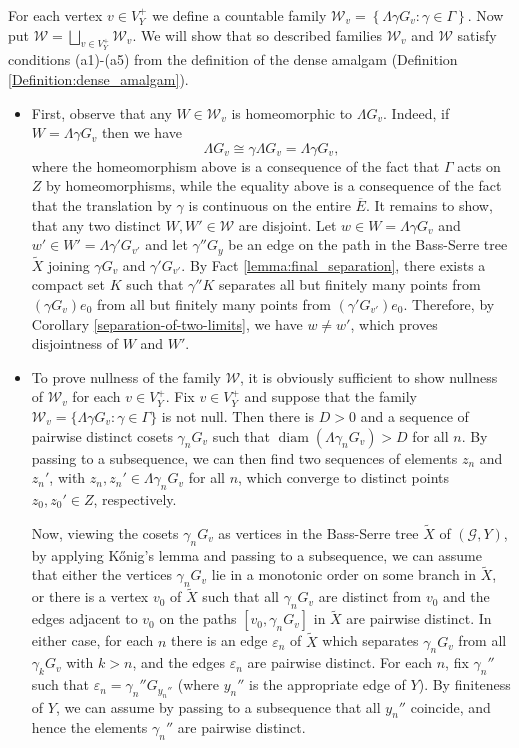 \documentclass[12pt, a4paper]{article}
\newcommand{\8}{\infty}
\newcommand{\set}[1]{\left\{ #1 \right\}}
\DeclareMathOperator{\diam}{diam}
\theoremstyle{break}
\theoremstyle{defbreak}
\newcommand{\ol}[1]{\overline{#1}}
\newcommand{\wtl}[1]{\widetilde{#1}}
\begin{document}
    For each vertex $v\in V_Y^+$ we define a countable family $\mathcal{W}_v = \set{\Lambda\gamma G_v: \gamma\in \Gamma}$. Now put $\mathcal{W} = \bigsqcup_{v\in V_Y^+}\mathcal{W}_v$. We will show that so described families $\mathcal{W}_v$ and $\mathcal{W}$ satisfy conditions (a1)-(a5) from the definition of the dense amalgam (Definition \ref{Definition:dense_amalgam}).
    \begin{itemize}
        \item[(a1)] First, observe that any $W\in \mathcal{W}_v$ is homeomorphic to $\Lambda G_v$. Indeed, if $W = \Lambda \gamma G_v$ then we have 
        $$\Lambda G_v \cong \gamma \Lambda G_v = \Lambda \gamma G_v,$$
        where the homeomorphism above is a consequence of the fact that $\Gamma$ acts on $Z$ by homeomorphisms, while the equality above is a consequence of the fact that the translation by $\gamma$ is continuous on the entire $\ol{E}$. It remains to show, that any two distinct $W,W'\in \mathcal{W}$ are disjoint. Let $w\in W = \Lambda\gamma G_v$ and $w'\in W' = \Lambda \gamma' G_{v'}$ and let $\gamma'' G_y$ be an edge on the path
        in the Bass-Serre tree $\wtl{X}$
        joining $\gamma G_v$ and $\gamma'G_{v'}$. By Fact \ref{lemma:final_separation}, there exists a compact set $K$ such that $\gamma''K$ separates all but finitely many points from $(\gamma G_v)e_0$ from all but finitely many points from $(\gamma'G_{v'})e_0$. Therefore, by Corollary \ref{separation-of-two-limits}, we have $w\neq w'$, which proves disjointness of $W$ and $W'$.
        
        \item[(a2)] To prove nullness of the family $\mathcal{W}$, it is obviously sufficient
to show nullness of $\mathcal{W}_v$ for each $v\in V_Y^+$.
Fix $v\in V_Y^+$ and suppose that the family
$\mathcal{W}_v=\{ \Lambda\gamma G_v:\gamma\in\Gamma \}$
is not null. Then there is $D>0$ and a sequence of pairwise distinct
cosets $\gamma_nG_v$ such that $\diam(\Lambda\gamma_nG_v)>D$
for all $n$. By passing to a subsequence, we can then find two sequences
of elements $z_n$ and $z_n'$, with $z_n,z_n'\in\Lambda\gamma_nG_v$
for all $n$, which converge to distinct points $z_0,z_0'\in Z$, respectively.
        
Now, viewing the cosets $\gamma_nG_v$ as vertices in the Bass-Serre
tree $\widetilde X$ of $(\mathcal{G},Y)$, by applying K\H{o}nig's lemma and passing to a subsequence,
we can assume that either the vertices $\gamma_nG_v$ lie in a monotonic
order on some branch in $\widetilde X$, or there is a vertex $v_0$ of
$\widetilde X$ such that all $\gamma_nG_v$ are distinct from $v_0$
and the edges adjacent to $v_0$ on the paths $[v_0,\gamma_nG_v]$
in $\widetilde X$ are pairwise distinct. In either case,
for each $n$ there is an edge $\varepsilon_n$ of $\widetilde X$
which separates $\gamma_nG_v$ from all $\gamma_kG_v$ with $k>n$,
and the edges $\varepsilon_n$ are pairwise distinct.
For each $n$, fix $\gamma_n''$ such that $\varepsilon_n=\gamma_n''G_{y_n''}$
(where $y_n''$ is the appropriate edge of $Y$).
By finiteness of $Y$, we can assume by passing to a subsequence that
all $y_n''$ coincide, and hence
the elements $\gamma_n''$ are pairwise distinct. 


\end{itemize}
\end{document}
